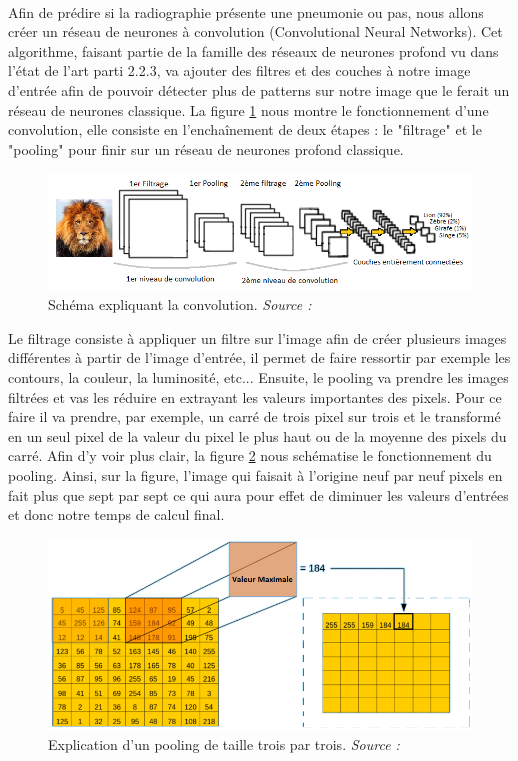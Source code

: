 \paragraph{}Afin de prédire si la radiographie présente une pneumonie ou pas, nous allons créer un réseau de neurones à convolution (Convolutional Neural Networks). Cet algorithme, faisant partie de la famille des réseaux de neurones profond vu dans l'état de l'art parti 2.2.3, va ajouter des filtres et des couches à notre image d'entrée afin de pouvoir détecter plus de patterns sur notre image que le ferait un réseau de neurones classique. La figure \ref{CNNExplain} nous montre le fonctionnement d'une convolution, elle consiste en l'enchaînement de deux étapes : le "filtrage" et le "pooling" pour finir sur un réseau de neurones profond classique.
\begin{figure}[h]
    \includegraphics[scale=0.7]{src_img/CNNExplain.png}
    \caption{Schéma expliquant la convolution. \textit{Source : \cite{CnnExplainArticle}}}
    \label{CNNExplain}
\end{figure}

Le filtrage consiste à appliquer un filtre sur l'image afin de créer plusieurs images différentes à partir de l'image d'entrée, il permet de faire ressortir par exemple les contours, la couleur, la luminosité, etc... Ensuite, le pooling va prendre les images filtrées et vas les réduire en extrayant les valeurs importantes des pixels. Pour ce faire il va prendre, par exemple, un carré de trois pixel sur trois et le transformé en un seul pixel de la valeur du pixel le plus haut ou de la moyenne des pixels du carré. Afin d'y voir plus clair, la figure \ref{CNNpooling} nous schématise le fonctionnement du pooling. Ainsi, sur la figure, l'image qui faisait à l'origine neuf par neuf pixels en fait plus que sept par sept ce qui aura pour effet de diminuer les valeurs d'entrées et donc notre temps de calcul final.

\begin{figure}[h]
    \includegraphics[scale=0.5]{src_img/CNNpooling.png}
    \caption{Explication d'un pooling de taille trois par trois. \textit{Source : \cite{CnnExplainArticle}}}
    \label{CNNpooling}
\end{figure}


